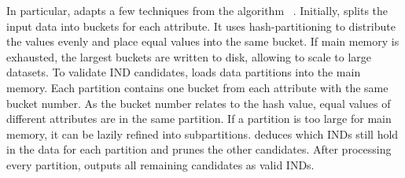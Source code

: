 In particular, \sawfish adapts a few techniques from the algorithm ~\cite{papenbrock2015divide}.
Initially,  splits the input data into buckets for each attribute. 
It uses hash-partitioning to distribute the values evenly and place equal values into the same bucket. %
If main memory is exhausted, the largest buckets are written to disk, allowing  to scale to large datasets.
To validate IND candidates,  loads data partitions into the main memory.
Each partition contains one bucket from each attribute with the same bucket number.
As the bucket number relates to the hash value, equal values of different attributes are in the same partition.
If a partition is too large for main memory, it can be lazily refined into subpartitions.
 deduces which INDs still hold in the data for each partition and prunes the other candidates.
After processing every partition,  outputs all remaining candidates as valid INDs.

